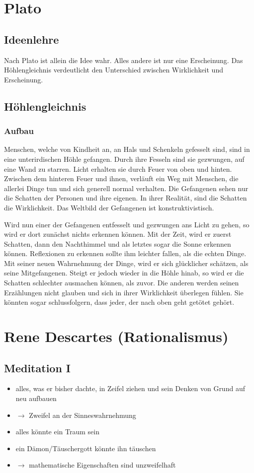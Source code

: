 \documentclass{article}
\begin{document}
\section*{Plato}
\subsection*{Ideenlehre}
Nach Plato ist allein die Idee wahr. Alles andere ist nur eine Erscheinung. Das Höhlengleichnis verdeutlicht
den Unterschied zwischen Wirklichkeit und Erscheinung.
\subsection*{Höhlengleichnis}
\subsubsection*{Aufbau}
Menschen, welche von Kindheit an, an Hals und Schenkeln gefesselt sind, sind in eine unterirdischen Höhle gefangen.
Durch ihre Fesseln sind sie gezwungen, auf eine Wand zu starren. Licht erhalten sie durch Feuer von oben und hinten.
Zwischen dem hinteren Feuer und ihnen, verläuft ein Weg mit Menschen, die allerlei Dinge tun und sich generell normal
verhalten. Die Gefangenen sehen nur die Schatten der Personen und ihre eigenen. In ihrer Realität, sind die Schatten
die Wirklichkeit. Das Weltbild der Gefangenen ist konstruktivistisch.

Wird nun einer der Gefangenen entfesselt und gezwungen ans Licht zu gehen, so wird er dort zunächst nichts erkennen
können. Mit der Zeit, wird er zuerst Schatten, dann den Nachthimmel und als letztes sogar die Sonne erkennen können.
Reflexionen zu erkennen sollte ihm leichter fallen, als die echten Dinge. Mit seiner neuen Wahrnehmung der Dinge,
wird er sich glücklicher schätzen, als seine Mitgefangenen. Steigt er jedoch wieder in die Höhle hinab, so wird er
die Schatten schlechter ausmachen können, als zuvor. Die anderen werden seinen Erzählungen nicht glauben und sich
in ihrer Wirklichkeit überlegen fühlen. Sie könnten sogar schlussfolgern, dass jeder, der nach oben geht getötet gehört.

\section*{Rene Descartes (Rationalismus)}
\subsection*{Meditation I}
\begin{itemize}
    \item alles, was er bisher dachte, in Zeifel ziehen und sein Denken von Grund auf neu aufbauen
    \item $\rightarrow$ Zweifel an der Sinneswahrnehmung
    \item alles könnte ein Traum sein
    \item ein Dämon/Täuschergott könnte ihn täuschen
    \item $\rightarrow$ mathematische Eigenschaften sind unzweifelhaft
\end{itemize}
\end{document}
